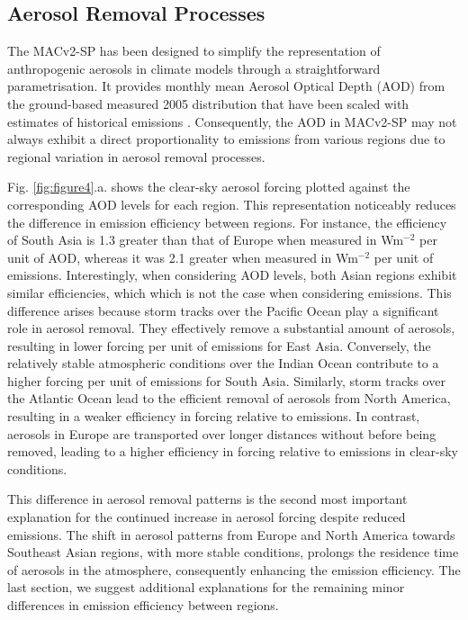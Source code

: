 \documentclass[draft]{agujournal2019}
\begin{document}
      \subsection{Aerosol Removal Processes}
            The MACv2-SP has been designed to simplify the representation of anthropogenic aerosols in climate models through a straightforward parametrisation. 
            It provides monthly mean Aerosol Optical Depth (AOD) from the ground-based measured 2005 distribution that have been scaled with estimates of historical emissions \cite{Stevens_2017}. 
            Consequently, the AOD in MACv2-SP may not always exhibit a direct proportionality to emissions from various regions due to regional variation in aerosol removal processes.

            Fig. \ref{fig:figure4}.a. shows the clear-sky aerosol forcing plotted against the corresponding AOD levels for each region. This representation noticeably reduces the difference in emission efficiency between regions. For instance, the efficiency of South Asia is 1.3 greater than that of Europe when measured in Wm$^{-2}$ per unit of AOD, whereas it was 2.1 greater when measured in Wm$^{-2}$ per unit of emissions.
            Interestingly, when considering AOD levels, both Asian regions exhibit similar efficiencies, which which is not the case when considering emissions. This difference arises because storm tracks over the Pacific Ocean play a significant role in aerosol removal. They effectively remove a substantial amount of aerosols, resulting in lower forcing per unit of emissions for East Asia. Conversely, the relatively stable atmospheric conditions over the Indian Ocean contribute to a higher forcing per unit of emissions for South Asia.
            Similarly, storm tracks over the Atlantic Ocean lead to the efficient removal of aerosols from North America, resulting in a weaker efficiency in forcing relative to emissions. In contrast, aerosols in Europe are transported over longer distances without before being removed, leading to a higher efficiency in forcing relative to emissions in clear-sky conditions.

            This difference in aerosol removal patterns is the second most important explanation for the continued increase in aerosol forcing despite reduced emissions. The shift in aerosol patterns from Europe and North America towards Southeast Asian regions, with more stable conditions, prolongs the residence time of aerosols in the atmosphere, consequently enhancing the emission efficiency.
            The last section, we suggest additional explanations for the remaining minor differences in emission efficiency between regions.
\end{document}
